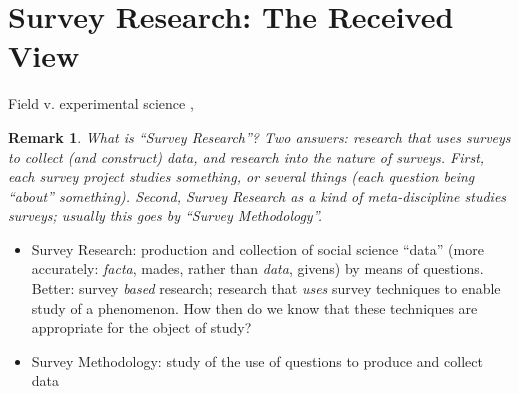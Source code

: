 \documentclass[11pt,twoside]{article}
\newtheorem{remark}{Remark}
\newcommand{\SMeth}{Survey Methodology}
\newcommand{\SR}{Survey Research}
\begin{document}
\begin{abstract}
Critical v. constructive

The purpose of this paper is two-fold.  First it provides an overview
of contemporary Pragmatism, in order to give substance to the claim
advanced above as to its revolutionary character.  One way to do this
is by contrasting it with its opposite number(s), so the result will
be to expose and clarify the fundamental themes and commitments of
representationalism and cognitivism, etc.  This will sharpen some
boundaries.

Once the background issues - theoretical, methodological, philosophical
- are clear, the other task is to examine, at least in a preliminary
manner, the implications of Pragmatism for \SR{}.  What is on offer is
a radical re-conceptualization of the entire enterprise.  A move away
from scientism toward a more properly (and appropriately)
anthropological perspective.

Caveat: we are not talking here about merely methodological issues.
It is not a question of doing the same thing, only better; of finding
an innovative method that solves the old problems.  What is suggested
is rather a fundamental change in the way we conceive of the task,
asking different questions, discarding the old questions as not useful
or even very meaningful.

\end{abstract}

\section{\SR{}: The Received View}

Field v. experimental science \parencite{ryan_replication_2011},
\parencite{hurlbert_pseudoreplication_1984}

\begin{remark}
What is ``\SR{}''?  Two answers: research that \textit{uses} surveys
to collect (and construct) data, and research into the nature of
surveys.  First, each survey project studies something, or several
things (each question being ``about'' something).  Second, \SR{} as a
kind of meta-discipline studies surveys; usually this goes by
``\SMeth{}''.
\end{remark}

\begin{itemize}
\item \SR{}: production and collection of social science ``data''
  (more accurately: \textit{facta}, mades, rather than \textit{data},
  givens) by means of questions.  Better: survey \textit{based}
  research; research that \textit{uses} survey techniques to enable
  study of a phenomenon.  How then do we know that these techniques
  are appropriate for the object of study?
\item \SMeth: study of the use of questions to produce and collect data
\end{itemize}
\end{document}

